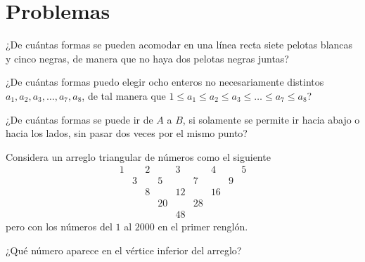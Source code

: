 \section{Problemas}

\begin{problema}
¿De cuántas formas se pueden acomodar en una línea recta siete pelotas blancas y cinco negras, de manera que no haya dos pelotas negras juntas?
\end{problema}

\begin{problema}
¿De cuántas formas puedo elegir ocho enteros no necesariamente distintos $a_1, a_2, a_3,\dots ,a_7, a_8$, de tal manera que $1\leq a_1\leq a_2 \leq a_3  \leq  \dots \leq a_7 \leq a_8$?
\end{problema}

\begin{problema}
¿De cuántas formas se puede ir de $A$ a $B$, si solamente se permite ir hacia abajo o hacia los lados, sin pasar dos veces por el mismo punto?

\begin{center}
\end{center}

\end{problema}
\vspace{2cm}


\begin{problema}
Considera un arreglo triangular de números como el siguiente
$$\begin{array}{ccccccccc}
     1 && 2 && 3 && 4 && 5\\
     & 3 && 5 && 7 && 9 &  \\
   && 8 && 12 && 16 &&  \\
  &&& 20 && 28 &&& \\
 &&&& 48 &&&&
\end{array}$$
pero con los números del $1$ al $2000$ en el primer renglón. 

¿Qué número aparece en el vértice inferior del arreglo?
\end{problema}
\vspace{2cm}


